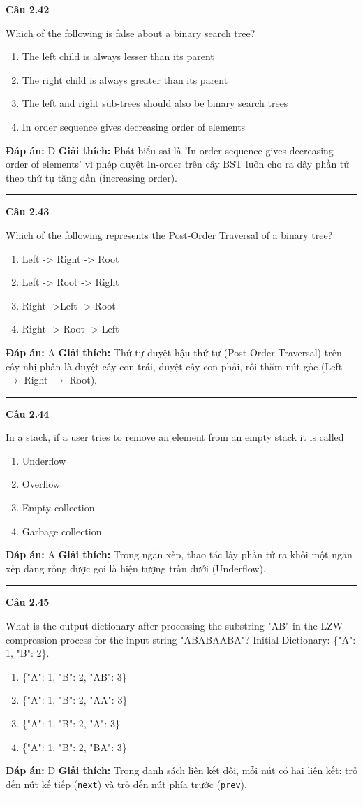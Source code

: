 \documentclass[11pt,a4paper]{article}
\newenvironment{question}[1]{%
  \par\vspace{1em}\noindent\textbf{\large Câu #1}\par\vspace{0.4em}
}{%
  \par\vspace{1em}\hrule\vspace{0.6em}
}
\newenvironment{choices}{%
  \begin{enumerate}[label=\textbf{\Alph*.},leftmargin=2.2em,itemsep=2pt,topsep=3pt]
}{%
  \end{enumerate}
}
\newcommand{\choice}{\item}
\begin{document}
\begin{question}{2.42}
Which of the following is false about a binary search tree?
\begin{choices}
\choice The left child is always lesser than its parent
\choice The right child is always greater than its parent
\choice The left and right sub-trees should also be binary search trees
\choice In order sequence gives decreasing order of elements
\end{choices}
\textbf{Đáp án:} D
\textbf{Giải thích:} Phát biểu sai là 'In order sequence gives decreasing order of elements' vì phép duyệt In-order trên cây BST luôn cho ra dãy phần tử theo thứ tự tăng dần (increasing order).
\end{question}

\begin{question}{2.43}
Which of the following represents the Post-Order Traversal of a binary tree?
\begin{choices}
\choice Left -> Right -> Root
\choice Left -> Root -> Right
\choice Right ->Left -> Root
\choice Right -> Root -> Left
\end{choices}
\textbf{Đáp án:} A
\textbf{Giải thích:} Thứ tự duyệt hậu thứ tự (Post-Order Traversal) trên cây nhị phân là duyệt cây con trái, duyệt cây con phải, rồi thăm nút gốc (Left $\to$ Right $\to$ Root).
\end{question}

\begin{question}{2.44}
In a stack, if a user tries to remove an element from an empty stack it is called
\begin{choices}
\choice Underflow
\choice Overflow
\choice Empty collection
\choice Garbage collection
\end{choices}
\textbf{Đáp án:} A
\textbf{Giải thích:} Trong ngăn xếp, thao tác lấy phần tử ra khỏi một ngăn xếp đang rỗng được gọi là hiện tượng tràn dưới (Underflow).
\end{question}

\begin{question}{2.45}
What is the output dictionary after processing the substring "AB" in the LZW compression process for the input string "ABABAABA"? Initial Dictionary: \{"A": 1, "B": 2\}.
\begin{choices}
\choice \{"A": 1, "B": 2, "AB": 3\}
\choice \{"A": 1, "B": 2, "AA": 3\}
\choice \{"A": 1, "B": 2, "A": 3\}
\choice \{"A": 1, "B": 2, "BA": 3\}
\end{choices}
\textbf{Đáp án:} D
\textbf{Giải thích:} Trong danh sách liên kết đôi, mỗi nút có hai liên kết: trỏ đến nút kế tiếp (\texttt{next}) và trỏ đến nút phía trước (\texttt{prev}).
\end{question}
\end{document}
